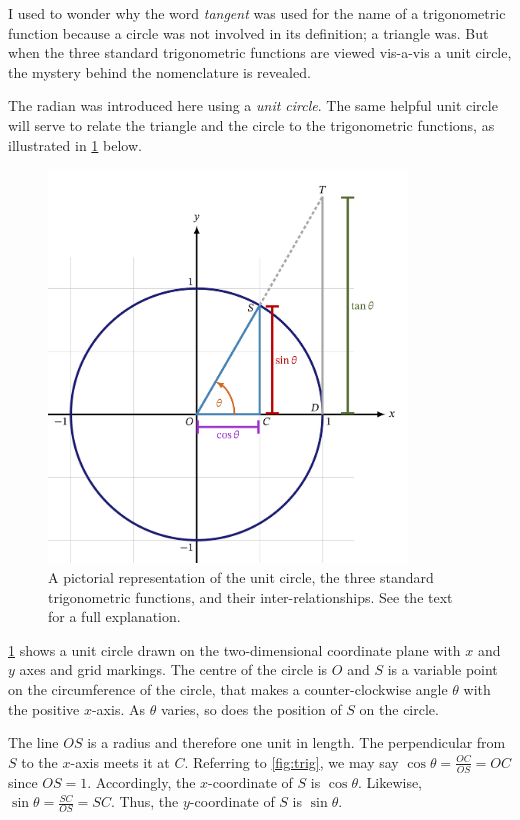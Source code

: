 \documentclass[
  a4paper,
]{article}
\begin{document}
I used to wonder why the word \emph{tangent} was used for the name of a
trigonometric function because a circle was not involved in its
definition; a triangle was. But when the three standard trigonometric
functions are viewed vis-a-vis a unit circle, the mystery behind the
nomenclature is revealed.

The radian was introduced here using a \emph{unit circle}. The same
helpful unit circle will serve to relate the triangle and the circle to
the trigonometric functions, as illustrated in \cref{fig:unit} below.

\begin{figure}
\hypertarget{fig:unit}{%
\centering
\includegraphics[width=0.85\textwidth,height=\textheight]{images/unit-circle.png}
\caption{A pictorial representation of the unit circle, the three
standard trigonometric functions, and their inter-relationships. See the
text for a full explanation.}\label{fig:unit}
}
\end{figure}

\cref{fig:unit} shows a unit circle drawn on the two-dimensional
coordinate plane with \(x\) and \(y\) axes and grid markings. The centre
of the circle is \(O\) and \(S\) is a variable point on the
circumference of the circle, that makes a counter-clockwise angle
\(\theta\) with the positive \(x\)-axis. As \(\theta\) varies, so does
the position of \(S\) on the circle.

The line \(OS\) is a radius and therefore one unit in length. The
perpendicular from \(S\) to the \(x\)-axis meets it at \(C\). Referring
to \cref{fig:trig}, we may say \(\cos\theta = \frac{OC}{OS} = OC\) since
\(OS = 1\). Accordingly, the \(x\)-coordinate of \(S\) is
\(\cos\theta\). Likewise, \(\sin\theta = \frac{SC}{OS} = SC\). Thus, the
\(y\)-coordinate of \(S\) is \(\sin\theta\).
\end{document}
